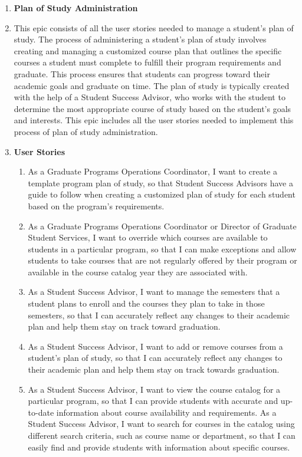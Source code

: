 \documentclass[12pt]{article}
\begin{document}
\begin{appendices}
\begin{enumerate}[label=(\roman*)]
        \item \textbf{Plan of Study Administration}
        \item[] This epic consists of all the user stories needed to manage a student's plan of study. The process of administering a student's plan of study involves creating and managing a customized course plan that outlines the specific courses a student must complete to fulfill their program requirements and graduate. This process ensures that students can progress toward their academic goals and graduate on time. The plan of study is typically created with the help of a Student Success Advisor, who works with the student to determine the most appropriate course of study based on the student's goals and interests. This epic includes all the user stories needed to implement this process of plan of study administration.
        \item[] \textbf{User Stories}
        \begin{enumerate}
            \item As a Graduate Programs Operations Coordinator, I want to create a template program plan of study, so that Student Success Advisors have a guide to follow when creating a customized plan of study for each student based on the program's requirements.
            \item As a Graduate Programs Operations Coordinator or Director of Graduate Student Services, I want to override which courses are available to students in a particular program, so that I can make exceptions and allow students to take courses that are not regularly offered by their program or available in the course catalog year they are associated with.
            \item As a Student Success Advisor, I want to manage the semesters that a student plans to enroll and the courses they plan to take in those semesters, so that I can accurately reflect any changes to their academic plan and help them stay on track toward graduation.
            \item As a Student Success Advisor, I want to add or remove courses from a student's plan of study, so that I can accurately reflect any changes to their academic plan and help them stay on track towards graduation.
            \item As a Student Success Advisor, I want to view the course catalog for a particular program, so that I can provide students with accurate and up-to-date information about course availability and requirements. As a Student Success Advisor, I want to search for courses in the catalog using different search criteria, such as course name or department, so that I can easily find and provide students with information about specific courses.

\end{enumerate}
\end{enumerate}
\end{appendices}
\end{document}
